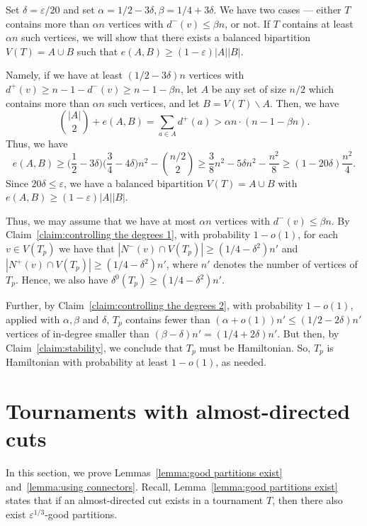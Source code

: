\documentclass[a4paper,11pt]{article}
\makeatletter
\renewenvironment{proof}[1][\proofname] {\par\pushQED{\qed}\normalfont\topsep6\p@\@plus6\p@\relax\trivlist\item[\hskip\labelsep\textit{#1}\@addpunct{.}]\ignorespaces}{\popQED\endtrivlist\@endpefalse}
\theoremstyle{definition}
\def\eps{\varepsilon}
\makeatother
\begin{document}
\begin{proof}[Proof of Lemma~\ref{lemma:bidense case}.]
Set $\delta=\eps/20$ and set $\alpha=1/2-3\delta, \beta=1/4+3\delta$. We have two cases — either $T$ contains more than $\alpha n$ vertices with $d^-(v)\leq \beta n$, or not. If $T$ contains at least $\alpha n$ such vertices, we will show that there exists a balanced bipartition $V(T)=A\cup B$ such that $e(A, B)\geq (1-\eps) |A||B|$.

Namely, if we have at least $(1/2-3\delta)n$ vertices with $d^+(v)\geq n-1-d^-(v)\geq n-1-\beta n$, let $A$ be any set of size $n/2$ which contains more than $\alpha n$ such vertices, and let $B=V(T)\backslash A$. Then, we have
\[\binom{|A|}{2}+e(A, B)=\sum_{a\in A}d^+(a)> \alpha n \cdot (n-1-\beta n).\]
Thus, we have
\[e(A, B)\geq \Big(\frac{1}{2}-3\delta\Big)\Big(\frac{3}{4}-4\delta\Big)n^2-\binom{n/2}{2}\geq \frac{3}{8}n^2-5\delta n^2-\frac{n^2}{8}\geq (1-20\delta)\frac{n^2}{4}.\]
Since $20\delta\leq \eps$, we have a balanced bipartition $V(T)=A\cup B$ with $e(A, B)\geq (1-\eps) |A||B|$.

Thus, we may assume that we have at most $\alpha n$ vertices with $d^-(v)\leq \beta n$. By Claim~\ref{claim:controlling the degrees 1}, with probability $1-o(1)$, for each $v\in V(T_p)$ we have that $|N^-(v)\cap V(T_p)|\geq (1/4- \delta^2) n'$ and $|N^+(v)\cap V(T_p)|\geq (1/4- \delta^2) n'$, where $n'$ denotes the number of vertices of $T_p$. Hence, we also have $\delta^0(T_p)\geq (1/4-\delta^2) n'$.

Further, by Claim~\ref{claim:controlling the degrees 2}, with probability $1-o(1)$, applied with $\alpha, \beta$ and $\delta$, $T_p$ contains fewer than $(\alpha+o(1)) n'\leq (1/2-2\delta)n'$ vertices of in-degree smaller than $(\beta-\delta)n'= (1/4+2\delta)n'$. But then, by Claim~\ref{claim:stability}, we conclude that $T_p$ must be Hamiltonian. So, $T_p$ is Hamiltonian with probability at least $1-o(1)$, as needed.
\end{proof}

\section{Tournaments with almost-directed cuts}\label{sec:almost directed}

In this section, we prove Lemmas~\ref{lemma:good partitions exist} and~\ref{lemma:using connectors}. Recall, Lemma~\ref{lemma:good partitions exist} states that if an almost-directed cut exists in a tournament $T$, then there also exist $\eps^{1/3}$-good partitions.
\end{document}
